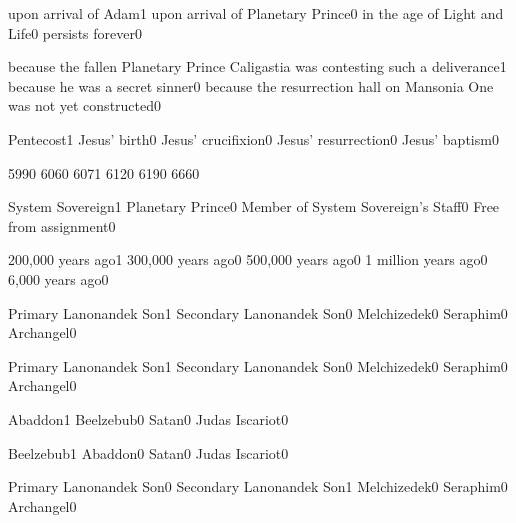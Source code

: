 
{upon arrival of Adam}{1}
{upon arrival of Planetary Prince}{0}
{in the age of Light and Life}{0}
{persists forever}{0}
\qstop


{because the fallen Planetary Prince Caligastia was contesting such a deliverance}{1}
{because he was a secret sinner}{0}
{because the resurrection hall on Mansonia One was not yet constructed}{0}
\qstop

{Pentecost}{1}
{Jesus' birth}{0}
{Jesus' crucifixion}{0}
{Jesus' resurrection}{0}
{Jesus' baptism}{0}
\qstop


{599}{0}
{606}{0}
{607}{1}
{612}{0}
{619}{0}
{666}{0}
\qstop

{System Sovereign}{1}
{Planetary Prince}{0}
{Member of System Sovereign's Staff}{0}
{Free from assignment}{0}
\qstop

{200,000 years ago}{1}
{300,000 years ago}{0}
{500,000 years ago}{0}
{1 million years ago}{0}
{6,000 years ago}{0}
\qstop

{Primary Lanonandek Son}{1}
{Secondary Lanonandek Son}{0}
{Melchizedek}{0}
{Seraphim}{0}
{Archangel}{0}
\qstop

{Primary Lanonandek Son}{1}
{Secondary Lanonandek Son}{0}
{Melchizedek}{0}
{Seraphim}{0}
{Archangel}{0}
\qstop

{Abaddon}{1}
{Beelzebub}{0}
{Satan}{0}
{Judas Iscariot}{0}
\qstop

{Beelzebub}{1}
{Abaddon}{0}
{Satan}{0}
{Judas Iscariot}{0}
\qstop

{Primary Lanonandek Son}{0}
{Secondary Lanonandek Son}{1}
{Melchizedek}{0}
{Seraphim}{0}
{Archangel}{0}
\qstop

